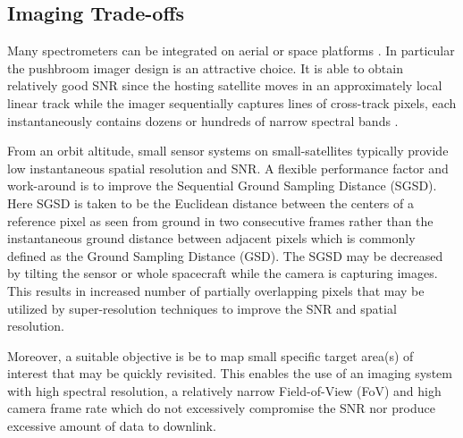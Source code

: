 \subsection{Imaging Trade-offs}
Many spectrometers can be integrated on aerial or space platforms \cite{Mouroulis2018, Wolfe1997}. In particular the pushbroom imager design is an attractive choice. It is able to obtain relatively good SNR since the hosting satellite moves in an approximately local linear track while the imager sequentially captures lines of cross-track pixels, each instantaneously contains dozens or hundreds of narrow spectral bands \cite{Fowler2014, VANE1993127}. 
  
From an orbit altitude, small sensor systems on small-satellites typically provide low instantaneous spatial resolution and SNR. A flexible performance factor and work-around is to improve the Sequential Ground Sampling Distance (SGSD). Here SGSD is taken to be the Euclidean distance between the centers of a reference pixel as seen from ground in two consecutive frames rather than the instantaneous ground distance between adjacent pixels which is commonly defined as the Ground Sampling Distance (GSD). The SGSD may be decreased by tilting the sensor or whole spacecraft while the camera is capturing images. This results in increased number of partially overlapping pixels that may be utilized by super-resolution techniques to improve the SNR and spatial resolution. 

Moreover, a suitable objective is be to map small specific target area(s) of interest that may be quickly revisited. This enables the use of an imaging system with high spectral resolution, a relatively narrow Field-of-View (FoV) and high camera frame rate which do not excessively compromise the SNR nor produce excessive amount of data to downlink. 
